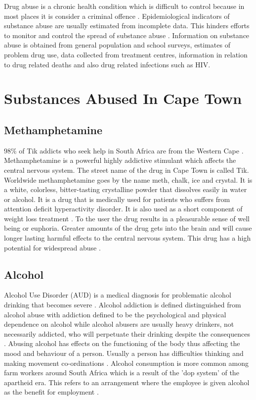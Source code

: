 Drug abuse is a chronic health condition which is difficult to control because in most places it is consider a criminal offence \cite{unodc2015}. Epidemiological indicators of substance abuse are usually estimated from incomplete data. This hinders efforts to monitor and control the spread of substance abuse  \cite{rossi2003role}. Information on substance abuse is obtained from general population and school surveys, estimates of problem drug use, data collected from treatment centres, information in relation to drug related deaths and also drug related infections such as HIV.

\section{Substances Abused In Cape Town}

\subsection{Methamphetamine}
$98\%$ of Tik addicts who seek help in South Africa are from the Western Cape \cite{mordenisation}. Methamphetamine is a powerful highly addictive stimulant which affects the central nervous system. The street name of the drug in Cape Town is called Tik. Worldwide methamphetamine goes by the name meth, chalk, ice and crystal. It is a white,  colorless, bitter-tasting crystalline powder that dissolves easily in water or alcohol. It is a drug that is medically used for patients who suffers from attention deficit hyperactivity disorder. It is also used as a short component of weight loss treatment . To the user the drug results in a pleasurable sense of well being or euphoria. Greater amounts of the drug gets into the brain and will cause longer lasting harmful effects to the central nervous system. This drug has a high potential for widespread abuse \cite{drugabuse1}.

\subsection{Alcohol}

Alcohol Use Disorder (AUD) is a medical diagnosis for problematic alcohol drinking that becomes severe \cite{nia}. Alcohol addiction is defined distinguished from alcohol abuse with addiction defined to be the psychological and physical dependence on alcohol while alcohol abusers are usually heavy drinkers, not necessarily addicted, who will perpetuate their drinking despite the consequences \cite{drug}.
Abusing alcohol has effects on the functioning of the body thus affecting the mood and behaviour of a person. Usually a person has difficulties thinking and making movement co-ordinations \cite{nia1}. Alcohol consumption is more common among farm workers around South Africa which is a result of the 'dop system' of the apartheid era. This refers to an arrangement where the employee is given alcohol as the benefit for employment \cite{london1999thedop}.  


